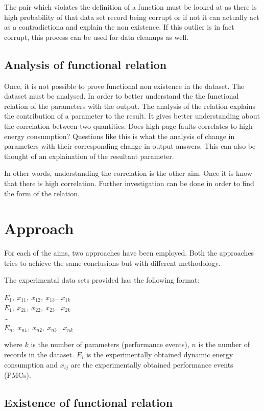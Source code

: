 The pair which violates the definition of a function must be looked at as there is high probability of that data set record being corrupt or if not it can actually act as a contradictiona and explain the non existence. If this outlier is in fact corrupt, this process can be used for data cleanups as well.

\subsection{Analysis of functional relation}

Once, it is not possible to prove functional non existence in the dataset. The dataset must be analysed. In order to better understand the the functional relation of the parameters with the output. The analysis of the relation explains the contribution of a parameter to the result. It gives better understanding about the correlation between two quantities. Does high page faults correlates to high energy consumption? Questions like this is what the analysis of change in parameters with their corresponding change in output answers. This can also be thought of an explaination of the resultant parameter.

In other words, understanding the correlation is the other aim. Once it is know that there is high correlation. Further investigation can be done in order to find the form of the relation.

\section{Approach}

For each of the aims, two approaches have been employed. Both the approaches tries to achieve the same conclusions but with different methodology.

The experimental data sets provided has the following format:

\(E_1,\ x_{11},\ x_{12},\ x_{13} \ldots x_{1k}\)\\
\(E_1,\ x_{21},\ x_{22},\ x_{23} \ldots x_{2k}\)\\
\ldots \\
\(E_n,\ x_{n1},\ x_{n2},\ x_{n3} \ldots x_{nk}\)

where \(k\) is the number of parameters (performance events), \(n\) is the number of records in the dataset.
\(E_i\) is the experimentally obtained dynamic energy consumption and \(x_{ij}\) are the experimentally obtained performance events (PMCs).

\subsection{Existence of functional relation}

